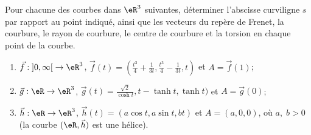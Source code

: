 \begin{exercice}\label{exoCourbesSurfaces0015}

Pour chacune des courbes dans $ \eR^3$ suivantes, déterminer l'abscisse curviligne $s$ par rapport au point indiqué, ainsi que les vecteurs du repère de Frenet, la courbure, le rayon de courbure, le centre de courbure et la torsion  en chaque point de la courbe. 


\begin{enumerate}
	\item
 $\vec{f} : \mathopen] 0 , \infty \mathclose[ \to \eR^3$, 
$ \vec{f}(t) = ( \frac{ t^3}{4} + \frac{1}{3t}, \frac{ t^3}{4} - \frac{1}{3t}, t )$
et $ A = \vec{f}(1)$; 


\item
 $ \vec{g} : \eR \to \eR^3$, 
$ \vec{g}(t) = \frac{ \sqrt{2}}{\cosh t} , t - \tanh t, \tanh t) $ et $A = \vec{g}(0)$; 

\item
 $\vec{h} : \eR \to \eR^3$, 
$ \vec{h}(t) = (a \cos t, a \sin t, bt)$ et  $A= (a, 0, 0)$,  
où $ a, \; b > 0$ (la courbe $(\eR, \vec{h})$ est une hélice).  

		
\end{enumerate}

\end{exercice}
